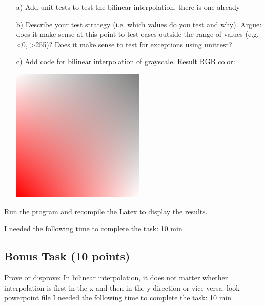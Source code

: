 \begin{enumerate}

\item[a)] Add unit tests to test the bilinear interpolation. there is one already

\item[b)] Describe your test strategy (i.e. which values do you test and why). Argue: does it make sense at this point to test cases outside the range of values (e.g. <0, >255)? Does it make sense to test for exceptions using unittest?

\item[c)] Add code for bilinear interpolation of grayscale. 
Result RGB color:

\includegraphics[width=0.5\textwidth]{source_code/bilinear_interpolate_rgb.png}

\end{enumerate}

Run the program and recompile the Latex to display the results.

I needed the following time to complete the task: 10 min

\subsection{Bonus Task (10 points)}

Prove or disprove: In bilinear interpolation, it does not matter whether interpolation is first in the x and then in the y direction or vice versa.
look powerpoint file
I needed the following time to complete the task: 10 min

